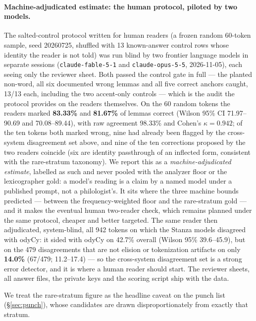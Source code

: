 \documentclass[11pt]{article}
\begin{document}
\paragraph{Machine-adjudicated estimate: the human protocol, piloted by two models.}
The salted-control protocol written for human readers (a frozen random 60-token sample, seed
20260725, shuffled with 13 known-answer control rows whose identity the reader is not told) was run
blind by two frontier language models in separate sessions
(\texttt{claude-fable-5-1} and \texttt{claude-opus-5-5}, 2026-11-05), each seeing only the
reviewer sheet. Both passed the control gate in full --- the planted non-word, all six documented
wrong lemmas and all five correct anchors caught, 13/13 each, including the two accent-only
controls --- which is the audit the protocol provides on the readers themselves. On the 60 random
tokens the readers marked \textbf{83.33\%} and \textbf{81.67\%} of lemmas correct (Wilson 95\% CI
71.97--90.69 and 70.08--89.44), with raw agreement 98.33\% and Cohen's $\kappa = 0.942$; of the ten
tokens both marked wrong, nine had already been flagged by the cross-system disagreement set above,
and nine of the ten corrections proposed by the two readers coincide (six are identity
passthrough of an inflected form, consistent with the rare-stratum taxonomy). We report this as a
\emph{machine-adjudicated estimate}, labelled as such and never pooled with the analyzer floor or the
lexicographer gold: a model's reading is a claim by a named model under a published prompt, not a
philologist's. It sits where the three machine bounds predicted --- between the frequency-weighted
floor and the rare-stratum gold --- and it makes the eventual human two-reader check, which remains
planned under the same protocol, cheaper and better targeted. The same reader then adjudicated,
system-blind, all 942 tokens on which the Stanza models disagreed with odyCy: it sided with odyCy
on 42.7\% overall (Wilson 95\% 39.6--45.9), but on the 479 disagreements that are not elision or
tokenization artifacts on only \textbf{14.0\%} (67/479; 11.2--17.4) --- so the cross-system
disagreement set is a strong error detector, and it is where a human reader should start. The
reviewer sheets, all answer files, the private keys and the scoring script ship with the data.

We treat the rare-stratum figure as the headline caveat on the punch list (\S\ref{sec:punch}),
whose candidates are drawn disproportionately from exactly that stratum.
\end{document}
